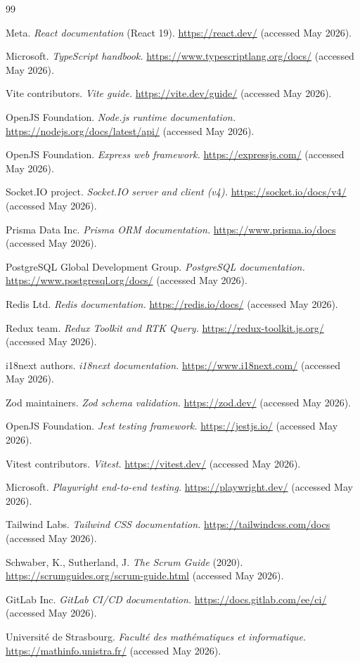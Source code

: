 \documentclass[11pt,a4paper]{article}
\begin{document}
\clearpage
\begin{thebibliography}{99}

Meta. \textit{React documentation} (React 19). \url{https://react.dev/} (accessed May 2026).

Microsoft. \textit{TypeScript handbook.} \url{https://www.typescriptlang.org/docs/} (accessed May 2026).

Vite contributors. \textit{Vite guide.} \url{https://vite.dev/guide/} (accessed May 2026).

OpenJS Foundation. \textit{Node.js runtime documentation.} \url{https://nodejs.org/docs/latest/api/} (accessed May 2026).

OpenJS Foundation. \textit{Express web framework.} \url{https://expressjs.com/} (accessed May 2026).

Socket.IO project. \textit{Socket.IO server and client (v4).} \url{https://socket.io/docs/v4/} (accessed May 2026).

Prisma Data Inc. \textit{Prisma ORM documentation.} \url{https://www.prisma.io/docs} (accessed May 2026).

PostgreSQL Global Development Group. \textit{PostgreSQL documentation.} \url{https://www.postgresql.org/docs/} (accessed May 2026).

Redis Ltd. \textit{Redis documentation.} \url{https://redis.io/docs/} (accessed May 2026).

Redux team. \textit{Redux Toolkit and RTK Query.} \url{https://redux-toolkit.js.org/} (accessed May 2026).

i18next authors. \textit{i18next documentation.} \url{https://www.i18next.com/} (accessed May 2026).

Zod maintainers. \textit{Zod schema validation.} \url{https://zod.dev/} (accessed May 2026).

OpenJS Foundation. \textit{Jest testing framework.} \url{https://jestjs.io/} (accessed May 2026).

Vitest contributors. \textit{Vitest.} \url{https://vitest.dev/} (accessed May 2026).

Microsoft. \textit{Playwright end-to-end testing.} \url{https://playwright.dev/} (accessed May 2026).

Tailwind Labs. \textit{Tailwind CSS documentation.} \url{https://tailwindcss.com/docs} (accessed May 2026).

Schwaber, K., Sutherland, J. \textit{The Scrum Guide} (2020). \url{https://scrumguides.org/scrum-guide.html} (accessed May 2026).

GitLab Inc. \textit{GitLab CI/CD documentation.} \url{https://docs.gitlab.com/ee/ci/} (accessed May 2026).

Université de Strasbourg. \textit{Faculté des mathématiques et informatique.} \url{https://mathinfo.unistra.fr/} (accessed May 2026).

\end{thebibliography}
\end{document}
